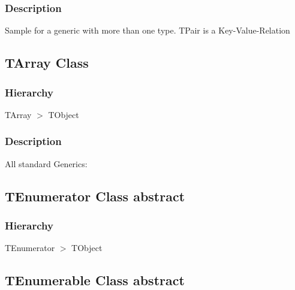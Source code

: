 \documentclass{report}
\newif\ifpdf
\begin{document}
\subsubsection*{\large{\textbf{Description}}\normalsize\hspace{1ex}\hfill}
Sample for a generic with more than one type. TPair is a Key{-}Value{-}Relation\ifpdf
\subsection*{\large{\textbf{TArray Class}}\normalsize\hspace{1ex}\hrulefill}
\else
\subsection*{TArray Class}
\fi
\label{ok_generic.TArray}
\subsubsection*{\large{\textbf{Hierarchy}}\normalsize\hspace{1ex}\hfill}
TArray {$>$} TObject
\subsubsection*{\large{\textbf{Description}}\normalsize\hspace{1ex}\hfill}
All standard Generics:\ifpdf
\subsection*{\large{\textbf{TEnumerator Class abstract}}\normalsize\hspace{1ex}\hrulefill}
\else
\subsection*{TEnumerator Class abstract}
\fi
\label{ok_generic.TEnumerator}
\subsubsection*{\large{\textbf{Hierarchy}}\normalsize\hspace{1ex}\hfill}
TEnumerator {$>$} TObject
\ifpdf
\subsection*{\large{\textbf{TEnumerable Class abstract}}\normalsize\hspace{1ex}\hrulefill}
\else
\end{document}
